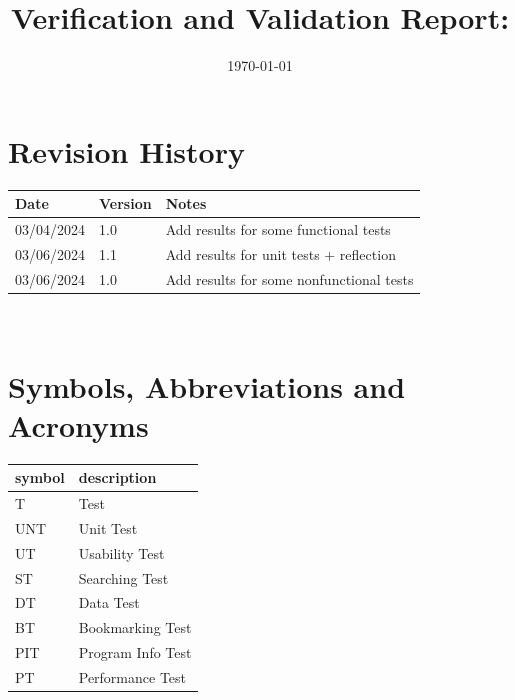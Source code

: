 \documentclass[12pt, titlepage]{article}
\begin{document}
\title{Verification and Validation Report: \progname} 
\author{\authname}
\date{\today}
	
\maketitle


\section{Revision History}

\begin{tabularx}{\textwidth}{p{3cm}p{2cm}X}
\toprule {\bf Date} & {\bf Version} & {\bf Notes}\\
\midrule
03/04/2024 & 1.0 & Add results for some functional tests\\
03/06/2024 & 1.1 & Add results for unit tests + reflection\\
03/06/2024 & 1.0 & Add results for some nonfunctional tests\\
\bottomrule
\end{tabularx}

~\newpage

\section{Symbols, Abbreviations and Acronyms}

\renewcommand{\arraystretch}{1.2}
\begin{tabular}{l l} 
  \toprule		
  \textbf{symbol} & \textbf{description}\\
  \midrule 
  T & Test\\
  UNT & Unit Test\\
  UT & Usability Test\\
  ST & Searching Test\\
  DT & Data Test\\
  BT & Bookmarking Test\\
  PIT & Program Info Test\\
  PT & Performance Test\\
  \bottomrule
\end{tabular}\\


\newpage

\tableofcontents

\listoftables %

\listoffigures %
\end{document}
